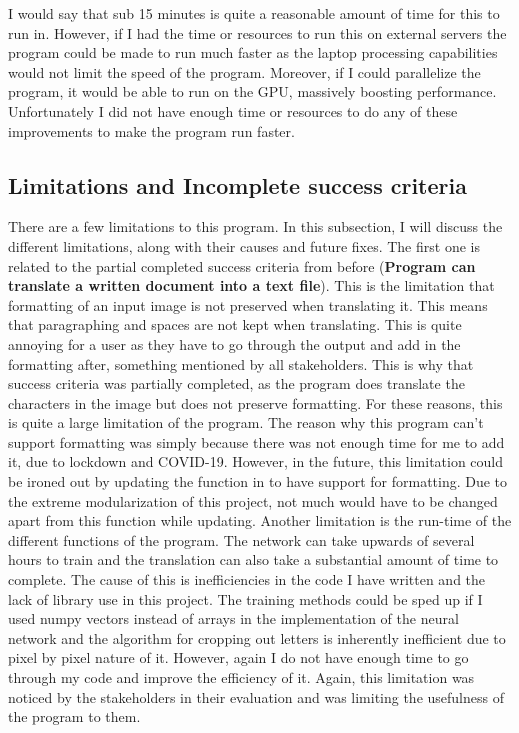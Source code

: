 \documentclass{report}
\begin{document}
\noindent I would say that sub 15 minutes is quite a reasonable amount of time for this to run in. However, if I had the time or resources to run this on external servers the program could be made to run much faster as the laptop processing capabilities would not limit the speed of the program. Moreover, if I could parallelize the program, it would be able to run on the GPU, massively boosting performance. Unfortunately I did not have enough time or resources to do any of these improvements to make the program run faster.
\newpage 

\subsection{Limitations and Incomplete success criteria}
There are a few limitations to this program. In this subsection, I will discuss the different limitations, along with their causes and future fixes.
\newline
The first one is related to the partial completed success criteria from before (\textbf{Program can translate a written document into a text file}). This is the limitation that formatting of an input image is not preserved when translating it. This means that paragraphing and spaces are not kept when translating. This is quite annoying for a user as they have to go through the output and add in the formatting after, something mentioned by all stakeholders. This is why that success criteria was partially completed, as the program does translate the characters in the image but does not preserve formatting. For these reasons, this is quite a large limitation of the program. The reason why this program can't support formatting was simply because there was not enough time for me to add it, due to lockdown and COVID-19. However, in the future, this limitation could be ironed out by updating the function in  to have support for formatting. Due to the extreme modularization of this project, not much would have to be changed apart from this function while updating.
\newline
\newline
Another limitation is the run-time of the different functions of the program. The network can take upwards of several hours to train and the translation can also take a substantial amount of time to complete. The cause of this is inefficiencies in the code I have written and the lack of library use in this project. The training methods could be sped up if I used numpy vectors instead of arrays in the implementation of the neural network and the algorithm for cropping out letters is inherently inefficient due to pixel by pixel nature of it. However, again I do not have enough time to go through my code and improve the efficiency of it. Again, this limitation was noticed by the stakeholders in their evaluation and was limiting the usefulness of the program to them.
\end{document}
